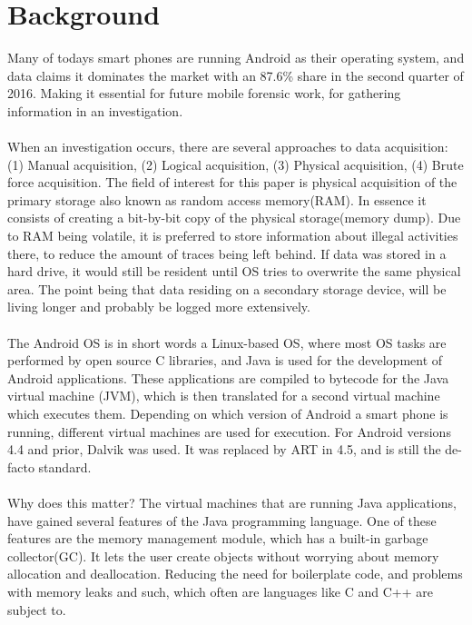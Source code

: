 \section{Background}
Many of todays smart phones are running Android as their operating system, and data claims it dominates the market with an 87.6\% share in the second quarter of 2016\cite{idc}. Making it essential for future mobile forensic work, for gathering information in an investigation.\\
\\
When an investigation occurs, there are several approaches to data acquisition: (1) Manual acquisition, (2) Logical acquisition, (3) Physical acquisition, (4) Brute force acquisition. The field of interest for this paper is physical acquisition of the primary storage also known as random access memory(RAM). In essence it consists of creating a bit-by-bit copy of the physical storage(memory dump). Due to RAM being volatile, it is preferred to store information about illegal activities there, to reduce the amount of traces being left behind. If data was stored in a hard drive, it would still be resident until OS tries to overwrite the same physical area. The point being that data residing on a secondary storage device, will be living longer and probably be logged more extensively.\\
\\
The Android OS is in short words a Linux-based OS, where most OS tasks are performed by open source C libraries, and Java is used for the development of Android applications. These applications are compiled to bytecode for the Java virtual machine (JVM), which is then translated for a second virtual machine which executes them. Depending on which version of Android a smart phone is running, different virtual machines are used for execution.
For Android versions 4.4 and prior, Dalvik was used. It was replaced by ART in 4.5, and is still the de-facto standard.\\
\\
Why does this matter? The virtual machines that are running Java applications, have gained several features of the Java programming language. One of these features are the memory management module, which has a built-in garbage collector(GC). It lets the user create objects without worrying about memory allocation and deallocation. Reducing the need for boilerplate code, and problems with memory leaks and such, which often are languages like C and C++ are subject to. \\
\\
